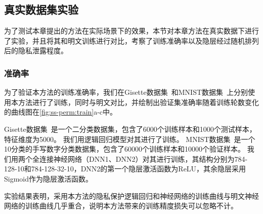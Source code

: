 \subsection{真实数据集实验}
为了测试本章提出的方法在实际场景下的效果，本节对本章方法在真实数据下进行了实验，并且将其和明文训练进行对比，考察了训练准确率以及隐层经过随机排列后的隐私泄露程度。

\subsubsection{准确率}
为了验证本方法的训练准确率，我们在Gisette数据集~\cite{2008_gisette}和MNIST数据集~\cite{mnist}上分别使用本方法进行了训练，同时与明文对比，并绘制出验证集准确率随着训练轮数变化的曲线图在\autoref{fig:ss-perm:train}a-c中。

%
Gisette数据集~\cite{2008_gisette}是一个二分类数据集，包含了6000个训练样本和1000个测试样本，特征维度为5000。
我们用逻辑回归模型对其进行了训练。
%
MNIST数据集~\cite{mnist}是一个10分类的手写数字分类数据集，包含了60000个训练样本和10000个验证样本。
我们用两个全连接神经网络（DNN1、DNN2）对其进行训练，其结构分别为784-128-10和784-128-32-10，DNN2的第一个隐层激活函数为ReLU，其余隐层采用Sigmoid作为隐层激活函数。

实验结果表明，采用本方法的隐私保护逻辑回归和神经网络的训练曲线与明文神经网络的训练曲线几乎重合，说明本方法带来的训练精度损失可以忽略不计。

